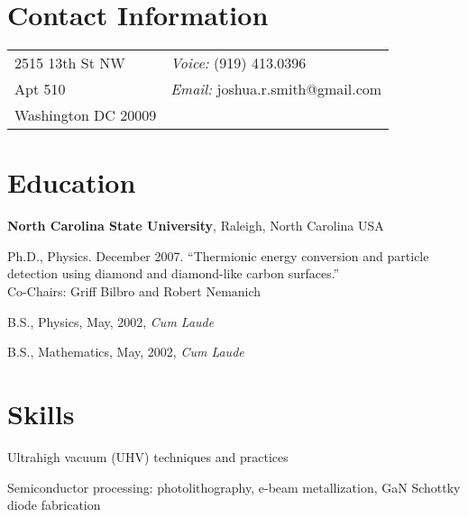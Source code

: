 \documentclass[letterpaper,margin,line]{res}
\newenvironment{list1}{
  \begin{list}{\ding{113}}{%
      \setlength{\itemsep}{0in}
      \setlength{\parsep}{0in} \setlength{\parskip}{0in}
      \setlength{\topsep}{0in} \setlength{\partopsep}{0in} 
      \setlength{\leftmargin}{0.17in}}}{\end{list}}
\begin{document}

\begin{resume}
\section{\sc Contact Information}
\vspace{.05in}
\begin{tabular}{@{}p{2in}p{4in}}
2515 13th St NW     & {\it Voice:} (919) 413.0396\\
Apt 510             & {\it Email:} {joshua.r.smith@gmail.com} \\
Washington DC 20009 & 
\end{tabular}


\section{\sc Education}

{\bf North Carolina State University}, Raleigh, North Carolina USA\\
\vspace*{-.1in}
\begin{list1}
\item[] Ph.D., Physics. December 2007. ``Thermionic energy conversion and particle detection using diamond and diamond-like carbon surfaces.'' \\Co-Chairs: Griff Bilbro and Robert Nemanich
\item[] B.S., Physics,  May, 2002, \textit{Cum Laude}
\item[] B.S., Mathematics, May, 2002, \textit{Cum Laude}
\end{list1}



\section{\sc Skills} 
Ultrahigh vacuum (UHV) techniques and practices

\vspace*{-2.5mm}
Semiconductor processing: photolithography, e-beam metallization, GaN Schottky diode fabrication


\end{resume}
\end{document}
